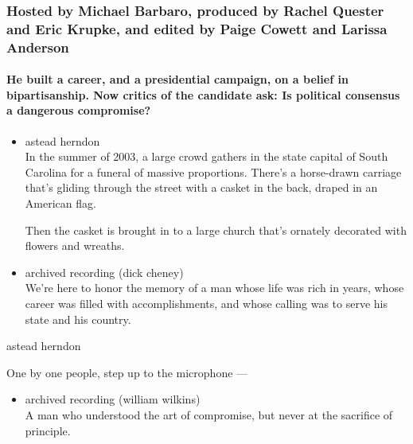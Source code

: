 \hypertarget{hosted-by-michael-barbaro-produced-by-rachel-quester-and-eric-krupke-and-edited-by-paige-cowett-and-larissa-anderson}{%
\subsubsection{Hosted by Michael Barbaro, produced by Rachel Quester and
Eric Krupke, and edited by Paige Cowett and Larissa
Anderson}\label{hosted-by-michael-barbaro-produced-by-rachel-quester-and-eric-krupke-and-edited-by-paige-cowett-and-larissa-anderson}}

\hypertarget{he-built-a-career-and-a-presidential-campaign-on-a-belief-in-bipartisanship-now-critics-of-the-candidate-ask-is-political-consensus-a-dangerous-compromise}{%
\paragraph{He built a career, and a presidential campaign, on a belief
in bipartisanship. Now critics of the candidate ask: Is political
consensus a dangerous
compromise?}\label{he-built-a-career-and-a-presidential-campaign-on-a-belief-in-bipartisanship-now-critics-of-the-candidate-ask-is-political-consensus-a-dangerous-compromise}}

\begin{itemize}
\item
  astead herndon\\
  In the summer of 2003, a large crowd gathers in the state capital of
  South Carolina for a funeral of massive proportions. There's a
  horse-drawn carriage that's gliding through the street with a casket
  in the back, draped in an American flag.

  Then the casket is brought in to a large church that's ornately
  decorated with flowers and wreaths.
\item
  archived recording (dick cheney)\\
  We're here to honor the memory of a man whose life was rich in years,
  whose career was filled with accomplishments, and whose calling was to
  serve his state and his country.
\end{itemize}

astead herndon

One by one people, step up to the microphone ---

\begin{itemize}
\tightlist
\item
  archived recording (william wilkins)\\
  A man who understood the art of compromise, but never at the sacrifice
  of principle.
\end{itemize}

